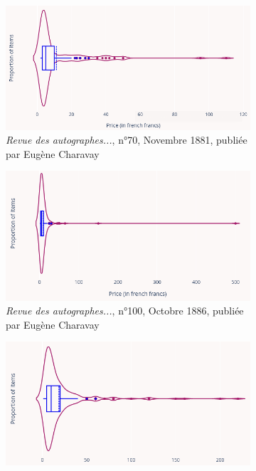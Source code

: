\begin{figure}[p]
	\centering
	\begin{subfigure}{0.6\textwidth}
		\includegraphics[width=\textwidth]{img/rda70_distrib.png}
		\caption{\textit{Revue des autographes...}, n°70, Novembre 1881, publiée par Eugène Charavay}
	\end{subfigure}
	\begin{subfigure}{0.6\textwidth}
		\includegraphics[width=\textwidth]{img/rda100_distrib.png}
		\caption{\textit{Revue des autographes...}, n°100, Octobre 1886, publiée par Eugène Charavay}
	\end{subfigure}
	\begin{subfigure}{0.6\textwidth}
		\includegraphics[width=\textwidth]{img/rda165_distrib.png}

\end{subfigure}
\end{figure}
